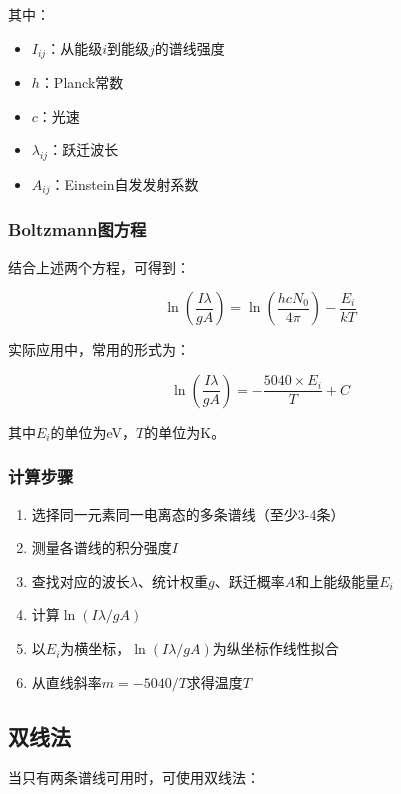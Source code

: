 \documentclass[12pt,a4paper]{article}
\begin{document}
其中：
\begin{itemize}
    \item $I_{ij}$：从能级$i$到能级$j$的谱线强度
    \item $h$：Planck常数
    \item $c$：光速
    \item $\lambda_{ij}$：跃迁波长
    \item $A_{ij}$：Einstein自发发射系数
\end{itemize}

\subsubsection{Boltzmann图方程}

结合上述两个方程，可得到：

\begin{equation}
\ln\left(\frac{I\lambda}{gA}\right) = \ln\left(\frac{hcN_0}{4\pi}\right) - \frac{E_i}{kT}
\end{equation}

实际应用中，常用的形式为：

\begin{equation}
\boxed{\ln\left(\frac{I\lambda}{gA}\right) = -\frac{5040 \times E_i}{T} + C}
\end{equation}

其中$E_i$的单位为eV，$T$的单位为K。

\subsubsection{计算步骤}

\begin{enumerate}
    \item 选择同一元素同一电离态的多条谱线（至少3-4条）
    \item 测量各谱线的积分强度$I$
    \item 查找对应的波长$\lambda$、统计权重$g$、跃迁概率$A$和上能级能量$E_i$
    \item 计算$\ln(I\lambda/gA)$
    \item 以$E_i$为横坐标，$\ln(I\lambda/gA)$为纵坐标作线性拟合
    \item 从直线斜率$m = -5040/T$求得温度$T$
\end{enumerate}

\subsection{双线法}

当只有两条谱线可用时，可使用双线法：
\end{document}

